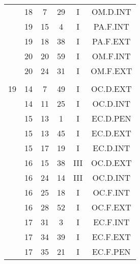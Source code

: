 \documentclass[12pt, a4paper]{article}
\begin{document}
\begin{multicols}{3}
{\begin{tabular}{c c c c c c}
	 	 	 	 & 18 & 7 & 29 & I & OM.D.INT\\%
	 	 	 	 & 19 & 15 & 4 & I & PA.F.INT\\%
	 	 	 	 & 19 & 18 & 38 & I & PA.F.EXT\\%
	 	 	 	 & 20 & 20 & 59 & I & OM.F.INT\\%
	 	 	 	 & 20 & 24 & 31 & I & OM.F.EXT\\%
	 	 	 	 & & & & & \\%
	 	 	 	19 & 14 & 7 & 49 & I & OC.D.EXT\\%
	 	 	 	 & 14 & 11 & 25 & I & OC.D.INT\\%
	 	 	 	 & 15 & 13 & 1 & I & EC.D.PEN\\%
	 	 	 	 & 15 & 13 & 45 & I & EC.D.EXT\\%
	 	 	 	 & 15 & 17 & 19 & I & EC.D.INT\\%
	 	 	 	 & 16 & 15 & 38 & III & OC.D.EXT\\%
	 	 	 	 & 16 & 24 & 14 & III & OC.D.INT\\%
	 	 	 	 & 16 & 25 & 18 & I & OC.F.INT\\%
	 	 	 	 & 16 & 28 & 52 & I & OC.F.EXT\\%
	 	 	 	 & 17 & 31 & 3 & I & EC.F.INT\\%
	 	 	 	 & 17 & 34 & 39 & I & EC.F.EXT\\%
	 	 	 	 & 17 & 35 & 21 & I & EC.F.PEN\\%
	 	 \end{tabular}
 	}
\end{multicols}
\end{document}
